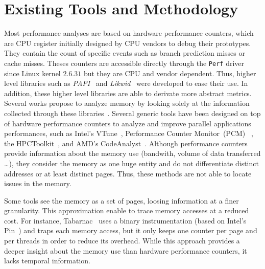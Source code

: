 \section{Existing Tools and Methodology}
\label{sec:mem-tools}

Most performance analyses are based on hardware performance counters, which are CPU
register initially designed by CPU vendors to debug their prototypes. They contain
the count of specific events such as branch prediction misses or cache misses.
Theses counters are accessible directly  through the \texttt{Perf} driver
since Linux kernel $2.6.31$ but they are CPU and vendor dependent. Thus, higher
level libraries such as \emph{PAPI}~\cite{Weaver13PAPI} and
\emph{Likwid}~\cite{Treibig10LIKWID} were developed to ease their use.
In addition, these higher level libraries are able to derivate more abstract metrics. Several works propose to analyze memory 
by looking solely at the information collected through these
libraries~\cite{Majo13(Mis)understanding,
Jiang14Understanding,Bosch00Rivet,Weyers14Visualization,Tao01Visualizing,DeRose01Hardware}.
%
Several generic tools have been designed on top of hardware performance counters
to analyze and improve parallel applications performances, such as Intel's
VTune~\cite{Reinders05VTune}, Performance Counter
Monitor~(PCM)~%
, the HPCToolkit~\cite{Adhianto10HPCTOOLKIT},
and AMD's CodeAnalyst~\cite{Drongowski08introduction}.
%
Although performance counters provide information about the memory use
(bandwith, volume of data transferred \ldots),  they consider the memory as
one huge entity and do not differentiate distinct addresses or at least
distinct pages. Thus, these methods are not able to locate issues in the memory.

Some tools see the memory as a set of pages, loosing information at a finer
granularity. This approximation enable to trace memory accesses at a reduced
cost. For instance, \gls{Tabarnac}~\cite{Beniamine15TABARNAC} uses a binary
instrumentation (based on Intel's Pin~\cite{Luk05Pin}) and traps each
memory access, but it only keeps one counter per page and per threads in order to
reduce its overhead. While this approach provides a deeper insight about the
memory use than hardware performance counters, it lacks temporal information.

